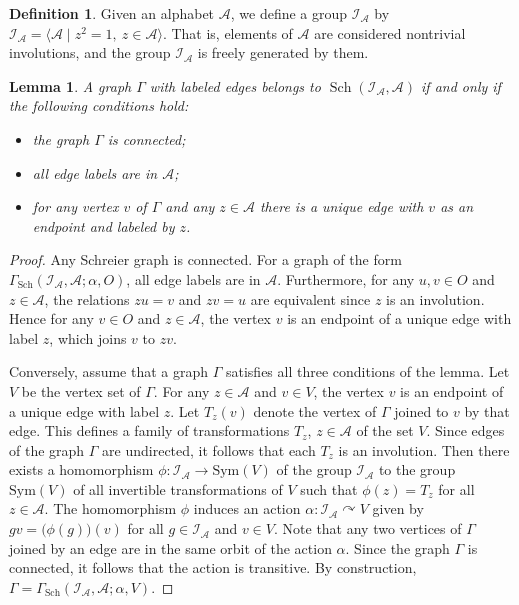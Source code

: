 \documentclass[12pt]{article}
\newtheorem{lemma}[theorem]{Lemma}
\theoremstyle{definition}
\newtheorem{definition}[theorem]{Definition}
\def\cA{\mathcal{A}}
\def\cI{\mathcal{I}}
\def\al{\alpha}
\def\Sch{\mathop{\mathrm{Sch}}}
\begin{document}
\begin{definition}\label{def-I_A}
Given an alphabet $\cA$, we define a group $\cI_{\cA}$ by 
$\cI_{\cA}=\langle\cA\mid z^2=1,\ z\in\cA\rangle$.  That is, elements of 
$\cA$ are considered nontrivial involutions, and the group $\cI_{\cA}$ is 
freely generated by them.
\end{definition}

\begin{lemma}\label{Sch-I_A}
A graph $\Gamma$ with labeled edges belongs to $\Sch(\cI_{\cA},\cA)$ if and 
only if the following conditions hold:
\begin{itemize}
\item
the graph $\Gamma$ is connected;
\item
all edge labels are in $\cA$;
\item
for any vertex $v$ of $\Gamma$ and any $z\in\cA$ there is a unique edge 
with $v$ as an endpoint and labeled by $z$.
\end{itemize}
\end{lemma}

\begin{proof}
Any Schreier graph is connected.  For a graph of the form 
$\Gamma_{\Sch}(\cI_{\cA},\cA;\al,O)$, all edge labels are in $\cA$.  
Furthermore, for any $u,v\in O$ and $z\in\cA$, the relations $zu=v$ and 
$zv=u$ are equivalent since $z$ is an involution.  Hence for any $v\in O$ 
and $z\in\cA$, the vertex $v$ is an endpoint of a unique edge with label 
$z$, which joins $v$ to $zv$.

Conversely, assume that a graph $\Gamma$ satisfies all three conditions of 
the lemma.  Let $V$ be the vertex set of $\Gamma$.  For any $z\in\cA$ and 
$v\in V$, the vertex $v$ is an endpoint of a unique edge with label $z$.  
Let $T_z(v)$ denote the vertex of $\Gamma$ joined to $v$ by that edge.  
This defines a family of transformations $T_z$, $z\in\cA$ of the set $V$.  
Since edges of the graph $\Gamma$ are undirected, it follows that each 
$T_z$ is an involution.  Then there exists a homomorphism 
$\phi:\cI_{\cA}\to\mathrm{Sym}(V)$ of the group $\cI_{\cA}$ to the group 
$\mathrm{Sym}(V)$ of all invertible transformations of $V$ such that 
$\phi(z)=T_z$ for all $z\in\cA$.  The homomorphism $\phi$ induces an action 
$\al:\cI_{\cA}\curvearrowright V$ given by $gv=\bigl(\phi(g)\bigr)(v)$ for 
all $g\in\cI_{\cA}$ and $v\in V$.  Note that any two vertices of $\Gamma$ 
joined by an edge are in the same orbit of the action $\al$.  Since the 
graph $\Gamma$ is connected, it follows that the action is transitive.  By 
construction, $\Gamma=\Gamma_{\Sch}(\cI_{\cA},\cA;\al,V)$.
\end{proof}
\end{document}

